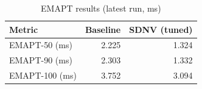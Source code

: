 \begin{table}[t]
\caption{EMAPT results (latest run, ms)}
\label{tab:emapt}
\centering
\begin{tabular}{lrr}
\hline
Metric & Baseline & SDNV (tuned) \\
\hline
EMAPT-50 (ms) & 2.225 & 1.324 \\
EMAPT-90 (ms) & 2.303 & 1.332 \\
EMAPT-100 (ms) & 3.752 & 3.094 \\
\hline
\end{tabular}
\end{table}
